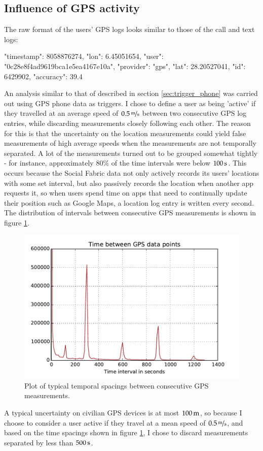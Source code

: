 \FloatBarrier
\subsection{Influence of GPS activity}
The raw format of the users' GPS logs looks similar to those of the call and text logs:
\begin{snippet}
	{
		"timestamp": 8058876274, 
		"lon": 6.45051654, 
		"user": "0c28e8f4ad9619bca1e5ea4167e10a", 
		"provider": "gps", 
		"lat": 28.20527041, 
		"id": 6429902, 
		"accuracy": 39.4
	}
\end{snippet}
An analysis similar to that of described in section \ref{sec:trigger_phone} was carried out using GPS phone data as triggers. I chose to define a user as being 'active' if they travelled at an average speed of $\unitfrac[0.5]{m}{s}$ between two consecutive GPS log entries, while discarding measurements closely following each other. The reason for this is that the uncertainty on the location measurements could yield false measurements of high average speeds when the measurements are not temporally separated. A lot of the measurements turned out to be grouped somewhat tightly - for instance, approximately $80\%$ of the time intervals were below $\unit[100]{s}$. This occurs because the Social Fabric data not only actively records its users' locations with some set interval, but also passively records the location when another app requests it, so when users spend time on apps that need to continually update their position such as Google Maps, a location log entry is written every second. The distribution of intervals between consecutive GPS measurements is shown in figure \ref{fig:gps_spacings}.
\begin{figure}[htbp]
	\centering
	\includegraphics[width = \textwidth]{pics/dtu/gps_spacings.pdf}
	\caption{Plot of typical temporal spacings between consecutive GPS measurements.}
	\label{fig:gps_spacings}
\end{figure}
A typical uncertainty on civilian GPS devices is at most $\unit[100]{m}$\cite{gps_precision}, so because I choose to consider a user active if they travel at a mean speed of $\unitfrac[0.5]{m}{s}$, and based on the time spacings shown in figure \ref{fig:gps_spacings}, I chose to discard measurements separated by less than $\unit[500]{s}$.

